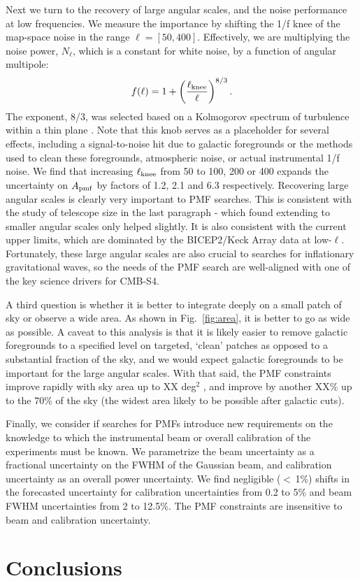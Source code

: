 \documentclass[preprint]{emulateapj}
\newcommand{\sqdeg}{deg$^2$ }
\newcommand{\apmf}{\ensuremath{A_{\rm pmf}}}
\newcommand{\lknee}{\ensuremath{\ell_{\rm knee}}}
\newcommand{\be}{\begin{equation}}
\newcommand{\ee}{\end{equation}}
\begin{document}
Next we turn to the recovery of large angular scales, and the noise performance at low frequencies. 
We measure the importance by shifting the 1/f knee of the map-space noise in the range $\ell = [50,400]$. 
Effectively, we are multiplying the noise power, $N_\ell$, which is a constant for white noise,  by a function of angular multipole:
\be
f(\ell) = 1 + \left(\frac{\ell_{\rm knee}}{\ell}\right)^{8/3}. 
\ee 
The exponent, 8/3, was selected based on a Kolmogorov spectrum of turbulence within a thin plane \citep{lay00}. %
Note that this knob  serves as a placeholder for several effects, including a signal-to-noise hit due to galactic foregrounds or the methods used to clean these foregrounds, atmospheric noise, or actual instrumental 1/f noise. 
We find that increasing \lknee{} from 50 to 100, 200 or 400 expands the uncertainty on \apmf{} by factors of 1.2, 2.1 and 6.3 respectively. 
Recovering large angular scales is clearly very important to PMF searches. 
This is consistent with the study of telescope size in the last paragraph - which found extending to smaller angular scales only helped slightly. 
It is also consistent with the current upper limits, which are dominated by the BICEP2/Keck Array data at low-$\ell$. 
Fortunately, these large angular scales are also crucial to searches for inflationary gravitational waves, so the needs of the PMF search are well-aligned with one of the key science drivers for CMB-S4.


A third question is whether it is better to integrate deeply on a small patch of sky or observe a wide area. 
As shown in  Fig.~\ref{fig:area}, it is better to go as wide as possible. 
A caveat to this analysis is that it is likely easier to remove galactic foregrounds to a specified level on targeted, `clean' patches as opposed to a substantial fraction of the sky, and we would expect galactic foregrounds to be important for the large angular scales. 
With that said, the PMF constraints improve rapidly with sky area up to XX \sqdeg, and improve by another XX\% up to the 70\% of the sky (the widest area likely to be possible after galactic cuts).


Finally, we consider if searches for PMFs introduce new requirements on the knowledge to which the instrumental beam or overall calibration of the experiments must be known. 
We parametrize the beam uncertainty as a fractional uncertainty on the FWHM of the Gaussian beam, and calibration uncertainty as an overall power uncertainty. 
We find negligible ($<$\,1\%) shifts in the forecasted uncertainty for calibration uncertainties from 0.2 to 5\% and beam FWHM uncertainties from 2 to 12.5\%. 
The PMF constraints are insensitive to beam and calibration uncertainty. 

\section{Conclusions}
\label{sec:conclusions}




\end{document}
